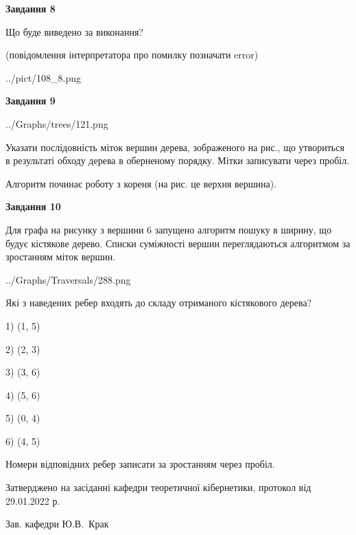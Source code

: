 \documentclass[12pt, ukrainian]{article}
\begin{document}
{\begin {large}
{\begin {center}\textbf{Завдання 8}\end {center}}\par
Що буде виведено за виконання?\par
 (повідомлення інтерпретатора про помилку позначати error)\par
\begin{center}
	{../pict/108_8.png}
\end{center}
\newpage

{\begin {center}\textbf{Завдання 9}\end {center}}\par

\begin{center}
	{../Graphs/trees/121.png}
\end{center}
Указати послідовність міток вершин дерева, зображеного на рис., що утвориться в результаті обходу дерева в оберненому порядку. Мітки записувати через пробіл.\par Алгоритм починає роботу з кореня (на рис. це верхня вершина).\par
\newpage

{\begin {center}\textbf{Завдання 10}\end {center}}\par
Для графа на рисунку з вершини 6 запущено алгоритм пошуку в ширину, що будує кістякове дерево. Списки суміжності вершин переглядаються алгоритмом за зростанням міток вершин.\par
\begin{center}
	{../Graphs/Traversals/288.png}
\end{center}
\par Які з наведених ребер входять до складу отриманого кістякового дерева?\par
1) (1, 5)\par
2) (2, 3)\par
3) (3, 6)\par
4) (5, 6)\par
5) (0, 4)\par
6) (4, 5)\par
{\vskip 15pt} Номери відповідних ребер записати за зростанням через пробіл.\par
\newpage


\end {large}
}
{\smallskip \begin {small} Затверджено на засіданні кафедри теоретичної кібернетики, протокол  від   29.01.2022 р.\par\smallskip\smallskip
{\parbox {6.5 cm}{Зав. кафедри \dotfill Ю.В.~Крак}} \end{small}}
\end{document}
